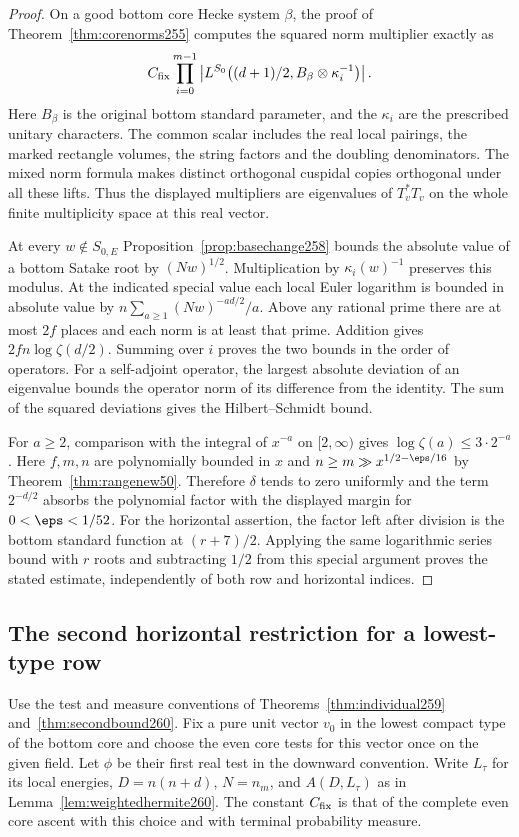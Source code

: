 \documentclass[a4paper,11pt]{article}
\theoremstyle{definition}
\theoremstyle{remark}
\numberwithin{equation}{section}
\begin{document}
\begin{proof}
On a good bottom core Hecke system \(\beta\), the proof of
Theorem~\ref{thm:corenorms255} computes the squared norm
multiplier exactly as
\[
  C_{\rm fix}\prod_{i=0}^{m-1}
      \left|L^{S_0}\big((d+1)/2,B_\beta\otimes\kappa_i^{-1}\big)\right|.
\]
Here \(B_\beta\) is the original bottom standard parameter,
and the \(\kappa_i\) are the prescribed unitary characters.
The common scalar includes the real local pairings, the
marked rectangle volumes, the string factors and the
doubling denominators. The mixed norm formula makes distinct
orthogonal cuspidal copies orthogonal under all these lifts.
Thus the displayed multipliers are eigenvalues of \(T_v^*T_v\)
on the whole finite multiplicity space at this real vector.

At every \(w\notin S_{0,E}\) Proposition~\ref{prop:basechange258}
bounds the absolute value of a bottom Satake root by
\((Nw)^{1/2}\). Multiplication by \(\kappa_i(w)^{-1}\) preserves
this modulus. At the indicated special value each local
Euler logarithm is bounded in absolute value by
\(n\sum_{a\ge1}(Nw)^{-ad/2}/a\). Above any rational prime
there are at most \(2f\) places and each norm is at least that
prime. Addition gives \(2fn\log\zeta(d/2)\). Summing over
\(i\) proves the two bounds in the order of operators.
For a self-adjoint operator, the largest absolute deviation
of an eigenvalue bounds the operator norm of its difference
from the identity. The sum of the squared deviations gives
the Hilbert--Schmidt bound.

For \(a\ge2\), comparison with the integral of \(x^{-a}\)
on \([2,\infty)\) gives \(\log\zeta(a)\le3\cdot2^{-a}\).
Here \(f,m,n\) are polynomially bounded in \(x\) and
\(n\ge m\gg x^{1/2-\eps/16}\) by
Theorem~\ref{thm:rangenew50}. Therefore \(\delta\) tends to
zero uniformly and the term \(2^{-d/2}\) absorbs the polynomial
factor with the displayed margin for \(0<\eps<1/52\).
For the horizontal assertion, the factor left after division is
the bottom standard function at \((r+7)/2\). Applying the same
logarithmic series bound with \(r\) roots and subtracting
\(1/2\) from this special argument proves the stated estimate,
independently of both row and horizontal indices.
\end{proof}

\subsection{The second horizontal restriction for a lowest-type row}\label{nav:II-50}
Use the test and measure conventions of
Theorems~\ref{thm:individual259} and~\ref{thm:secondbound260}.
Fix a pure unit vector \(v_0\) in the lowest compact type
of the bottom core and choose the even core tests for this
vector once on the given field. Let \(\phi\) be their first
real test in the downward convention. Write \(L_\tau\) for its
local energies, \(D=n(n+d)\), \(N=n_m\), and \(A(D,L_\tau)\)
as in Lemma~\ref{lem:weightedhermite260}. The constant
\(C_{\rm fix}\) is that of the complete even core ascent with
this choice and with terminal probability measure.
\end{document}
